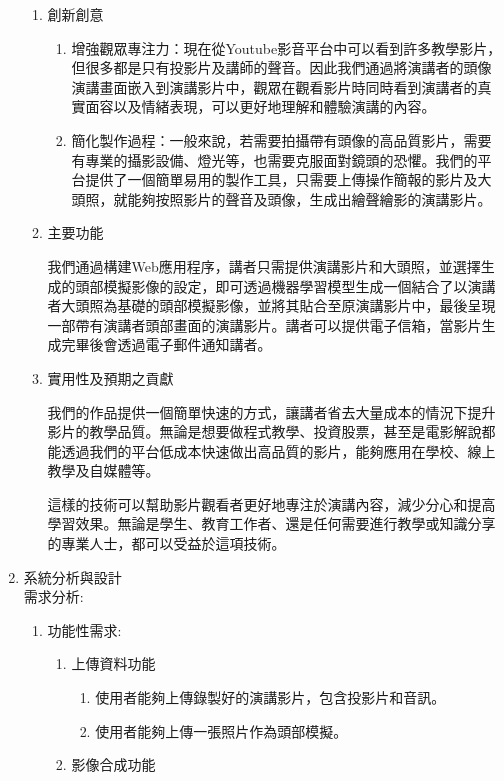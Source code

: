 \documentclass[12pt]{article}
\begin{document}
\begin{enumerate}
\begin{enumerate}[label=\Alph*.]
      \item 創新創意
        \begin{enumerate}[label=(\arabic*)]
          \item 增強觀眾專注力：現在從Youtube影音平台中可以看到許多教學影片，但很多都是只有投影片及講師的聲音。因此我們通過將演講者的頭像演講畫面嵌入到演講影片中，觀眾在觀看影片時同時看到演講者的真實面容以及情緒表現，可以更好地理解和體驗演講的內容。
          \item 簡化製作過程：一般來說，若需要拍攝帶有頭像的高品質影片，需要有專業的攝影設備、燈光等，也需要克服面對鏡頭的恐懼。我們的平台提供了一個簡單易用的製作工具，只需要上傳操作簡報的影片及大頭照，就能夠按照影片的聲音及頭像，生成出繪聲繪影的演講影片。
        \end{enumerate}
      \item 主要功能
        \par 我們通過構建Web應用程序，講者只需提供演講影片和大頭照，並選擇生成的頭部模擬影像的設定，即可透過機器學習模型生成一個結合了以演講者大頭照為基礎的頭部模擬影像，並將其貼合至原演講影片中，最後呈現一部帶有演講者頭部畫面的演講影片。講者可以提供電子信箱，當影片生成完畢後會透過電子郵件通知講者。
      \item 實用性及預期之貢獻
        \par 我們的作品提供一個簡單快速的方式，讓講者省去大量成本的情況下提升影片的教學品質。無論是想要做程式教學、投資股票，甚至是電影解說都能透過我們的平台低成本快速做出高品質的影片，能夠應用在學校、線上教學及自媒體等。
        \par 這樣的技術可以幫助影片觀看者更好地專注於演講內容，減少分心和提高學習效果。無論是學生、教育工作者、還是任何需要進行教學或知識分享的專業人士，都可以受益於這項技術。
    \end{enumerate}
  \item 系統分析與設計\\
    需求分析:
    \begin{enumerate}[label=\Alph*.]
      \item 功能性需求:
        \begin{enumerate}
          \item 上傳資料功能
            \begin{enumerate}[label=(\arabic*)]
              \item 使用者能夠上傳錄製好的演講影片，包含投影片和音訊。
              \item 使用者能夠上傳一張照片作為頭部模擬。
            \end{enumerate}
          \item 影像合成功能

\end{enumerate}
\end{enumerate}
\end{enumerate}
\end{document}
